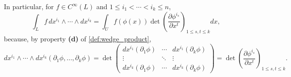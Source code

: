 In particular, for $f \in C^\infty(L)$ and $1\leq i_1<\cdots<i_k\leq n$,
\[\int_L f\,dx^{i_1}\wedge\cdots\wedge dx^{i_k} = \int_U f(\phi(x))\det\!\left(\frac{\partial
  \phi^{i_s}}{\partial x^t}\right)_{1\leq s,t\leq k} dx,\]
because, by property \textbf{(d)} of \cref{def:wedge_product},
\[dx^{i_1}\wedge\cdots\wedge dx^{i_k}(\partial_1\phi,\ldots,\partial_k\phi) = \det\!\left(
  \begin{smallmatrix} dx^{i_1}(\partial_1\phi) & \cdots & dx^{i_1}(\partial_k\phi) \\
  \vdots & \ddots & \vdots \\ dx^{i_k}(\partial_1\phi) & \cdots & dx^{i_k}(\partial_k\phi)
  \end{smallmatrix}\right) = \det\!\left(\frac{\partial\phi^{i_s}}{\partial x^t}\right)_{1\leq
  s,t\leq k}.\]

